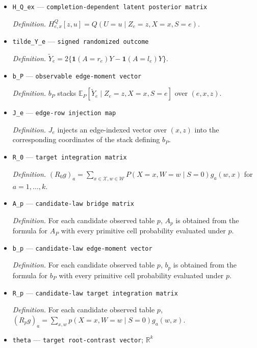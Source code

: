 \documentclass{article}
\begin{document}
\begin{itemize}
  \item \texttt{H\_\allowbreak{}Q\_\allowbreak{}ex} --- \texttt{completion-\allowbreak{}dependent latent posterior matrix}
  \par\smallskip\noindent\emph{Definition.} \(H^Q_{e,x}[z,u]=Q(U=u\mid Z_e=z,X=x,S=e)\).
  \item \texttt{tilde\_\allowbreak{}Y\_\allowbreak{}e} --- \texttt{signed randomized outcome}
  \par\smallskip\noindent\emph{Definition.} \(\widetilde Y_e=2\{\mathbf 1(A=r_e)Y-\mathbf 1(A=l_e)Y\}\).
  \item \texttt{b\_\allowbreak{}P} --- \texttt{observable edge-\allowbreak{}moment vector}
  \par\smallskip\noindent\emph{Definition.} \(b_P\) stacks \(\mathbb E_P[\widetilde Y_e\mid Z_e=z,X=x,S=e]\) over \((e,x,z)\).
  \item \texttt{J\_\allowbreak{}e} --- \texttt{edge-\allowbreak{}row injection map}
  \par\smallskip\noindent\emph{Definition.} \(J_e\) injects an edge-indexed vector over \((x,z)\) into the corresponding coordinates of the stack defining \(b_P\).
  \item \texttt{R\_\allowbreak{}0} --- \texttt{target integration matrix}
  \par\smallskip\noindent\emph{Definition.} \((R_0g)_a=\sum_{x\in\mathcal X,w\in\mathcal W}P(X=x,W=w\mid S=0)g_a(w,x)\) for \(a=1,\ldots,k\).
  \item \texttt{A\_\allowbreak{}p} --- \texttt{candidate-\allowbreak{}law bridge matrix}
  \par\smallskip\noindent\emph{Definition.} For each candidate observed table \(p\), \(A_p\) is obtained from the formula for \(A_P\) with every primitive cell probability evaluated under \(p\).
  \item \texttt{b\_\allowbreak{}p} --- \texttt{candidate-\allowbreak{}law edge-\allowbreak{}moment vector}
  \par\smallskip\noindent\emph{Definition.} For each candidate observed table \(p\), \(b_p\) is obtained from the formula for \(b_P\) with every primitive cell probability evaluated under \(p\).
  \item \texttt{R\_\allowbreak{}p} --- \texttt{candidate-\allowbreak{}law target integration matrix}
  \par\smallskip\noindent\emph{Definition.} For each candidate observed table \(p\), \((R_p g)_a=\sum_{x,w}p(X=x,W=w\mid S=0)g_a(w,x)\).
  \item \texttt{theta} --- \texttt{target root-\allowbreak{}contrast vector}; \(\mathbb R^k\)

\end{itemize}
\end{document}
